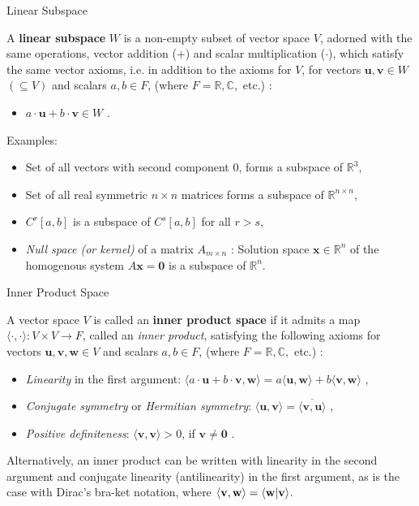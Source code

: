 \documentclass{beamer}
\newcommand\boldtext[1]{\textcolor{bolds}{\textbf{#1}}}
\newcommand\italictext[1]{\textcolor{italics}{\textit{#1}}}
\begin{document}
\begin{frame}{Linear Subspace}
    \begin{definition}
        A \boldtext{linear subspace} $W$ is a non-empty subset of vector space $V$, adorned with the same operations, vector addition ($+$) and scalar multiplication ($\cdot$), which satisfy the same vector axioms, i.e. in addition to the axioms for $V$, for vectors $\mathbf{u},\mathbf{v} \in {W}$ $(\subseteq V)$ and scalars $a,b \in {F}$, (where $F=\mathbb{R}, \mathbb{C},$ etc.) :
        \begin{itemize}
            \item $a\cdot\mathbf{u}+b\cdot\mathbf{v}\in W$ .
        \end{itemize}
    \end{definition}
    Examples:
    \begin{itemize}
        \item Set of all vectors with second component $0$, forms a subspace of $\mathbb{R}^3$,
        \item Set of all real symmetric $n\times n$ matrices forms a subspace of $\mathbb{R}^{n\times n}$,
        \item $C^r[a,b]$ is a subspace of $C^s[a,b]$ for all $r>s$,
        \item \italictext{Null space (or kernel)} of a matrix $A_{m\times n}$ : Solution space $\mathbf{x}\in\mathbb{R}^n$ of the homogenous system $A\mathbf{x}=\mathbf{0}$ is a subspace of $\mathbb{R}^n$.
    \end{itemize}
\end{frame}

\begin{frame}{Inner Product Space}
    \begin{definition}
        A vector space $V$ is called an \boldtext{inner product space} if it admits a map $\langle\cdot,\cdot\rangle:V\times V\to F$, called an \italictext{inner product}, satisfying the following axioms for vectors $\mathbf{u},\mathbf{v},\mathbf{w} \in V$ and scalars $a,b \in F$, (where $F=\mathbb{R}, \mathbb{C},$ etc.) :
        \begin{itemize}
            \item \italictext{Linearity} in the first argument: $\langle a\cdot\mathbf{u}+b\cdot\mathbf{v},\mathbf{w}\rangle=a\langle \mathbf{u},\mathbf{w}\rangle+b\langle\mathbf{v},\mathbf{w}\rangle$ ,
            \item \italictext{Conjugate symmetry} or \italictext{Hermitian symmetry}: $\langle\mathbf{u},\mathbf{v}\rangle = \overline{\langle \mathbf{v},\mathbf{u}\rangle}$ ,
            \item \italictext{Positive definiteness}: $\langle\mathbf{v},\mathbf{v}\rangle>0$, if $\mathbf{v}\neq\mathbf{0}$ .
        \end{itemize}
    \end{definition}
    Alternatively, an inner product can be written with linearity in the second argument and conjugate linearity (antilinearity) in the first argument, as is the case with Dirac's bra-ket notation, where $\langle\mathbf{v},\mathbf{w}\rangle=\braket{\mathbf{w}}{\mathbf{v}}$.
\end{frame}
\end{document}
